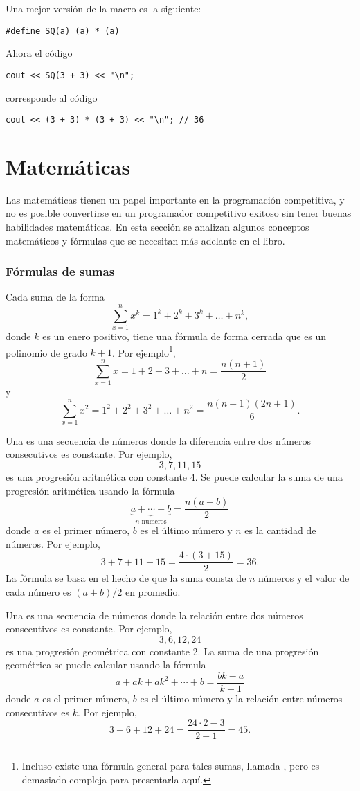 Una mejor versión de la macro es la siguiente:
\begin{lstlisting}
#define SQ(a) (a) * (a)
\end{lstlisting}
Ahora el código
\begin{lstlisting}
cout << SQ(3 + 3) << "\n";
\end{lstlisting}
corresponde al código
\begin{lstlisting}
cout << (3 + 3) * (3 + 3) << "\n"; // 36
\end{lstlisting}


\section{Matemáticas}

Las matemáticas tienen un papel importante en la programación
competitiva, y no es posible convertirse en
un programador competitivo exitoso sin
tener buenas habilidades matemáticas.
En esta sección se analizan algunos
conceptos matemáticos y fórmulas que
se necesitan más adelante en el libro.

\subsubsection{Fórmulas de sumas}

Cada suma de la forma
\[\sum_{x=1}^n x^k = 1^k+2^k+3^k+\ldots+n^k,\]
donde $k$ es un enero positivo,
tiene una fórmula de forma cerrada que es un
polinomio de grado $k+1$.
Por ejemplo\footnote{
Incluso existe una fórmula general para tales sumas, llamada ,
pero es demasiado compleja para presentarla aquí.},
\[\sum_{x=1}^n x = 1+2+3+\ldots+n = \frac{n(n+1)}{2}\]
y
\[\sum_{x=1}^n x^2 = 1^2+2^2+3^2+\ldots+n^2 = \frac{n(n+1)(2n+1)}{6}.\]

Una  es una 
secuencia de números
donde la diferencia entre dos números consecutivos
es constante.
Por ejemplo,
\[3, 7, 11, 15\]
es una progresión aritmética con constante 4.
Se puede calcular la suma de una progresión aritmética
usando la fórmula
\[\underbrace{a + \cdots + b}_{n \,\, \textrm{números}} = \frac{n(a+b)}{2}\]
donde $a$ es el primer número,
$b$ es el último número y
$n$ es la cantidad de números.
Por ejemplo,
\[3+7+11+15=\frac{4 \cdot (3+15)}{2} = 36.\]
La fórmula se basa en el hecho
de que la suma consta de $n$ números y
el valor de cada número es $(a+b)/2 $ en promedio.

Una  es una secuencia
de números
donde la relación entre dos números consecutivos
es constante.
Por ejemplo,
\[3,6,12,24\]
es una progresión geométrica con constante 2.
La suma de una progresión geométrica se puede calcular
usando la fórmula
\[a + ak + ak^2 + \cdots + b = \frac{bk-a}{k-1}\]
donde $a$ es el primer número,
$b$ es el último número y la
relación entre números consecutivos es $k$.
Por ejemplo,
\[3+6+12+24=\frac{24 \cdot 2 - 3}{2-1} = 45.\]

